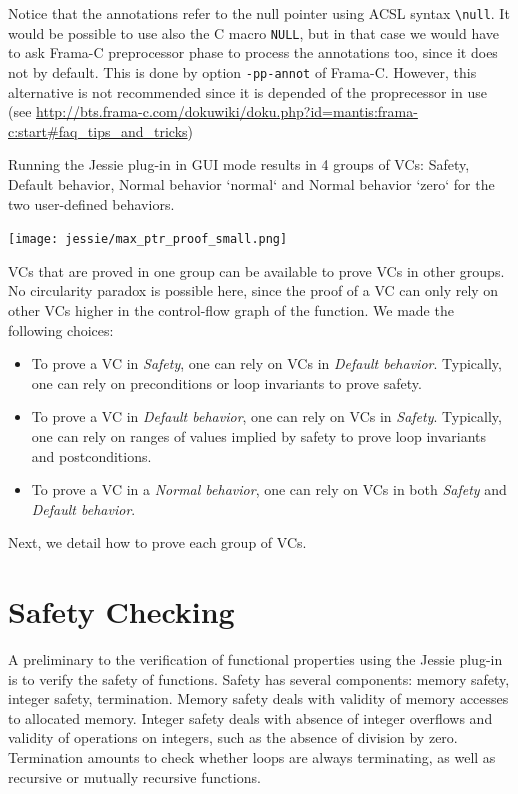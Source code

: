 \documentclass[a4paper,11pt,twoside,openright]{report}
\begin{document}
Notice that the annotations refer to the null pointer using ACSL
syntax \verb|\null|. It would be possible to use also the C macro
\texttt{NULL}, but in that case we would have to ask Frama-C
preprocessor phase to process the annotations too, since it does not
by default. This is done by option \verb|-pp-annot| of
Frama-C. However, this alternative is not recommended since it is
depended of the proprecessor in use (see \url{http://bts.frama-c.com/dokuwiki/doku.php?id=mantis:frama-c:start#faq_tips_and_tricks})

Running the Jessie plug-in in GUI mode results in 4 groups of VCs:
Safety, Default behavior, Normal behavior `normal` and Normal behavior
`zero` for the two user-defined behaviors.

\begin{center}
  \texttt{[image: jessie/max\_ptr\_proof\_small.png]}
\end{center}

VCs that are proved in one group can be available to prove VCs in other
groups. No circularity paradox is possible here, since the proof of a
VC can only rely on other VCs higher in the control-flow graph of the
function. We made the following choices:

\begin{itemize}
\item To prove a VC in \textit{Safety}, one can rely on VCs in
  \textit{Default behavior}. Typically, one can rely on preconditions
  or loop invariants to prove safety.
\item To prove a VC in \textit{Default behavior}, one can rely on VCs
  in \textit{Safety}. Typically, one can rely on ranges of values
  implied by safety to prove loop invariants and postconditions.
\item To prove a VC in a \textit{Normal behavior}, one can rely on VCs
  in both \textit{Safety} and \textit{Default behavior}.
\end{itemize}

Next, we detail how to prove each group of VCs.

\chapter{Safety Checking}

A preliminary to the verification of functional properties 
using the Jessie plug-in is to
verify the safety of functions. Safety has several components: memory
safety, integer safety, termination. Memory safety deals with validity
of memory accesses to allocated memory. Integer safety deals with
absence of integer overflows and validity of operations on integers,
such as the absence of division by zero. Termination amounts to check
whether loops are always terminating, as well as recursive or
mutually recursive functions.
\end{document}
